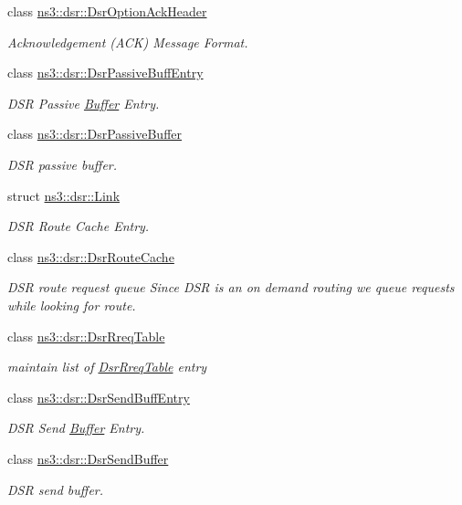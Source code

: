 \begin{DoxyCompactItemize}
class \hyperlink{classns3_1_1dsr_1_1DsrOptionAckHeader}{ns3\+::dsr\+::\+Dsr\+Option\+Ack\+Header}
\begin{DoxyCompactList}\small\item\em Acknowledgement (A\+CK) Message Format. \end{DoxyCompactList}\item 
class \hyperlink{classns3_1_1dsr_1_1DsrPassiveBuffEntry}{ns3\+::dsr\+::\+Dsr\+Passive\+Buff\+Entry}
\begin{DoxyCompactList}\small\item\em D\+SR Passive \hyperlink{classns3_1_1Buffer}{Buffer} Entry. \end{DoxyCompactList}\item 
class \hyperlink{classns3_1_1dsr_1_1DsrPassiveBuffer}{ns3\+::dsr\+::\+Dsr\+Passive\+Buffer}
\begin{DoxyCompactList}\small\item\em D\+SR passive buffer. \end{DoxyCompactList}\item 
struct \hyperlink{structns3_1_1dsr_1_1Link}{ns3\+::dsr\+::\+Link}
\begin{DoxyCompactList}\small\item\em D\+SR Route Cache Entry. \end{DoxyCompactList}\item 
class \hyperlink{classns3_1_1dsr_1_1DsrRouteCache}{ns3\+::dsr\+::\+Dsr\+Route\+Cache}
\begin{DoxyCompactList}\small\item\em D\+SR route request queue Since D\+SR is an on demand routing we queue requests while looking for route. \end{DoxyCompactList}\item 
class \hyperlink{classns3_1_1dsr_1_1DsrRreqTable}{ns3\+::dsr\+::\+Dsr\+Rreq\+Table}
\begin{DoxyCompactList}\small\item\em maintain list of \hyperlink{classns3_1_1dsr_1_1DsrRreqTable}{Dsr\+Rreq\+Table} entry \end{DoxyCompactList}\item 
class \hyperlink{classns3_1_1dsr_1_1DsrSendBuffEntry}{ns3\+::dsr\+::\+Dsr\+Send\+Buff\+Entry}
\begin{DoxyCompactList}\small\item\em D\+SR Send \hyperlink{classns3_1_1Buffer}{Buffer} Entry. \end{DoxyCompactList}\item 
class \hyperlink{classns3_1_1dsr_1_1DsrSendBuffer}{ns3\+::dsr\+::\+Dsr\+Send\+Buffer}
\begin{DoxyCompactList}\small\item\em D\+SR send buffer. \end{DoxyCompactList}\end{DoxyCompactItemize}
